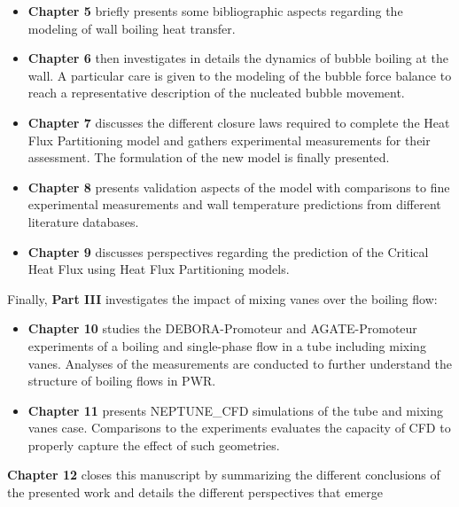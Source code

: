 \begin{itemize}
\item \textbf{Chapter 5} briefly presents some bibliographic aspects regarding the modeling of wall boiling heat transfer.

\item \textbf{Chapter 6} then investigates in details the dynamics of bubble boiling at the wall. A particular care is given to the modeling of the bubble force balance to reach a representative description of the nucleated bubble movement.

\item \textbf{Chapter 7} discusses the different closure laws required to complete the Heat Flux Partitioning model and gathers experimental measurements for their assessment. The formulation of the new model is finally presented.

\item \textbf{Chapter 8} presents validation aspects of the model with comparisons to fine experimental measurements and wall temperature predictions from different literature databases.

\item \textbf{Chapter 9} discusses perspectives regarding the prediction of the Critical Heat Flux using Heat Flux Partitioning models.
\end{itemize}

Finally, \textbf{Part III} investigates the impact of mixing vanes over the boiling flow:

\begin{itemize}
\item \textbf{Chapter 10} studies the DEBORA-Promoteur and AGATE-Promoteur experiments of a boiling and single-phase flow in a tube including mixing vanes. Analyses of the measurements are conducted to further understand the structure of boiling flows in PWR.

\item \textbf{Chapter 11} presents NEPTUNE\_CFD simulations of the tube and mixing vanes case. Comparisons to the experiments evaluates the capacity of CFD to properly capture the effect of such geometries.
\end{itemize}

\textbf{Chapter 12} closes this manuscript by summarizing the different conclusions of the presented work and details the different perspectives that emerge